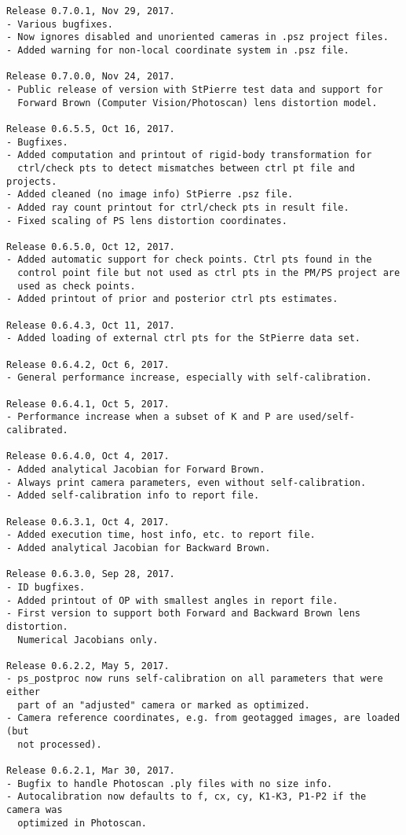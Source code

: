 \documentclass{article}
\begin{document}
\begin{verbatim}
Release 0.7.0.1, Nov 29, 2017.
- Various bugfixes.
- Now ignores disabled and unoriented cameras in .psz project files.
- Added warning for non-local coordinate system in .psz file.

Release 0.7.0.0, Nov 24, 2017.
- Public release of version with StPierre test data and support for
  Forward Brown (Computer Vision/Photoscan) lens distortion model.

Release 0.6.5.5, Oct 16, 2017.
- Bugfixes.
- Added computation and printout of rigid-body transformation for
  ctrl/check pts to detect mismatches between ctrl pt file and projects.
- Added cleaned (no image info) StPierre .psz file.
- Added ray count printout for ctrl/check pts in result file.
- Fixed scaling of PS lens distortion coordinates.

Release 0.6.5.0, Oct 12, 2017.
- Added automatic support for check points. Ctrl pts found in the
  control point file but not used as ctrl pts in the PM/PS project are
  used as check points.
- Added printout of prior and posterior ctrl pts estimates.

Release 0.6.4.3, Oct 11, 2017.
- Added loading of external ctrl pts for the StPierre data set.

Release 0.6.4.2, Oct 6, 2017.
- General performance increase, especially with self-calibration.

Release 0.6.4.1, Oct 5, 2017.
- Performance increase when a subset of K and P are used/self-calibrated.

Release 0.6.4.0, Oct 4, 2017.
- Added analytical Jacobian for Forward Brown.
- Always print camera parameters, even without self-calibration.
- Added self-calibration info to report file.

Release 0.6.3.1, Oct 4, 2017.
- Added execution time, host info, etc. to report file.
- Added analytical Jacobian for Backward Brown.

Release 0.6.3.0, Sep 28, 2017.
- ID bugfixes.
- Added printout of OP with smallest angles in report file.
- First version to support both Forward and Backward Brown lens distortion.
  Numerical Jacobians only.

Release 0.6.2.2, May 5, 2017.
- ps_postproc now runs self-calibration on all parameters that were either 
  part of an "adjusted" camera or marked as optimized.
- Camera reference coordinates, e.g. from geotagged images, are loaded (but
  not processed).

Release 0.6.2.1, Mar 30, 2017.
- Bugfix to handle Photoscan .ply files with no size info.
- Autocalibration now defaults to f, cx, cy, K1-K3, P1-P2 if the camera was
  optimized in Photoscan.


\end{verbatim}
\end{document}
